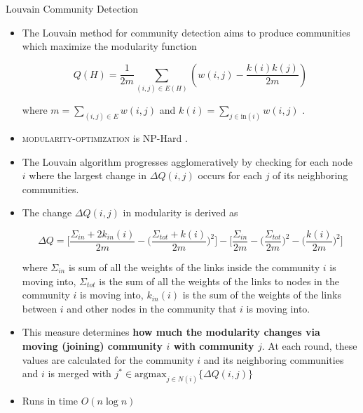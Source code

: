 \documentclass{beamer}
\begin{document}
\begin{frame}[allowframebreaks]{Louvain Community Detection}

\begin{itemize}
    \item<1-> The Louvain method for community detection aims to produce communities which maximize the modularity function 
    
    $$Q(H) = \frac {1}{2m} \sum_{(i, j) \in E(H)} \left ( w(i, j) - \frac {k(i) k(j)} {2m} \right )$$
    
    where $m = \sum_{(i, j) \in E} w(i,j)$ and $k(i) = \sum_{j \in \mathrm{in}(i)} w(i, j)$ . 
    
    \item<2-> \textsc{modularity-optimization} is NP-Hard \cite{modularity}.
    \item<3-> The Louvain algorithm progresses agglomeratively by checking for each node $i$ where the largest change in $\Delta Q (i, j) $ occurs for each $j$ of its neighboring communities. 
    \framebreak
    
    \item<4-> The change $\Delta Q(i, j)$ in modularity is derived as 
        
    \small {
    $$ \Delta Q = \bigg[ \frac{\Sigma_{in} + 2k_{in} (i)}{2m} - \bigg(\frac{\Sigma_{tot} + k(i)}{2m}\bigg)^2 \bigg]-\bigg[\frac{\Sigma_{in}}{2m} - \bigg(\frac{\Sigma_{tot}}{2m}\bigg)^2-\bigg(\frac{k(i)}{2m}\bigg)^2\bigg] $$
    }
        
    
    where $\Sigma_{in}$ is sum of all the weights of the links inside the community $i$ is moving into, $\Sigma_{tot}$ is the sum of all the weights of the links to nodes in the community $i$ is moving into, $k_{in} (i)$ is the sum of the weights of the links between $i$ and other nodes in the community that $i$ is  moving into.
	\item<5-> This measure determines \textbf{how much the modularity changes via moving (joining) community $i$ with community $j$}. At each round, these values are calculated for the community $i$ and its neighboring communities and $i$ is merged with $j^* \in \mathrm{argmax}_{j \in N(i)} \{ \Delta Q(i, j) \}$
	
	
 
	
	\item<6-> Runs in time $O(n \log n)$
    
\end{itemize}

\end{frame}
\end{document}
